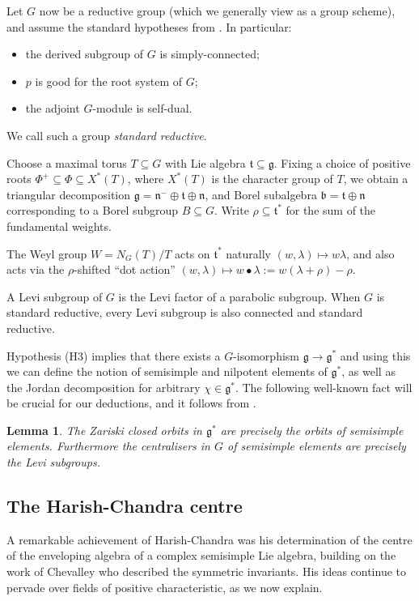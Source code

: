 \documentclass[twoside,12pt,reqno]{amsart}
\newtheorem{Lemma}[Theorem]{Lemma}
\theoremstyle{remark}
\numberwithin{equation}{section}
\def\b{\mathfrak b}
\def\g{{\mathfrak g}}
\def\n{\mathfrak n}
\def\t{\mathfrak t}
\def\b{\mathfrak{b}}
\begin{document}
Let $G$ now be a reductive group (which we generally view as a group scheme), and assume the standard hypotheses from \cite[]{JaLA}. In particular:
\begin{itemize}
    \item[(H1)] the derived subgroup of $G$ is simply-connected;
    \item[(H2)] $p$ is good for the root system of $G$;
    \item[(H3)] the adjoint $G$-module is self-dual.
\end{itemize}
We call such a group {\it standard reductive}.

 Choose a maximal torus $T \subseteq G$ with Lie algebra $\t \subseteq \g$. Fixing a choice of positive roots $\Phi^+ \subseteq \Phi \subseteq X^*(T)$, where $X^*(T)$ is the character group of $T$, we obtain a triangular decomposition $\g = \n^- \oplus \t \oplus \n$, and Borel subalgebra $\b = \t \oplus \n$ corresponding to a Borel subgroup $B \subseteq G$. Write $\rho \subseteq \t^*$ for the sum of the fundamental weights.

 The Weyl group $W = N_G(T) / T$ acts on $\t^*$ naturally $(w, \lambda) \mapsto w\lambda$, and also acts via the $\rho$-shifted ``dot action'' $(w, \lambda) \mapsto w \bullet \lambda := w(\lambda + \rho) - \rho$.


 A Levi subgroup of $G$ is the Levi factor of a parabolic subgroup. When $G$ is standard reductive, every Levi subgroup is also connected and standard reductive. 

 Hypothesis (H3) implies that there exists a $G$-isomorphism $\g \to \g^*$ and using this we can define the notion of semisimple and nilpotent elements of $\g^*$, as well as the Jordan decomposition for arbitrary $\chi \in \g^*$. The following well-known fact will be crucial for our deductions, and it follows from \cite[Proposition~7.13]{JaNO}.
\begin{Lemma}
\label{L:Zariskiclosedsemisimple}
     The Zariski closed orbits in $\g^*$ are precisely the orbits of semisimple elements. Furthermore the centralisers in $G$ of semisimple elements are precisely the Levi subgroups. 
\end{Lemma}

\subsection{The Harish-Chandra centre}\label{ss:HCcentre}
A remarkable achievement of Harish-Chandra was his determination of the centre of the enveloping algebra of a complex semisimple Lie algebra, building on the work of Chevalley who described the symmetric invariants. His ideas continue to pervade over fields of positive characteristic, as we now explain.
\end{document}
